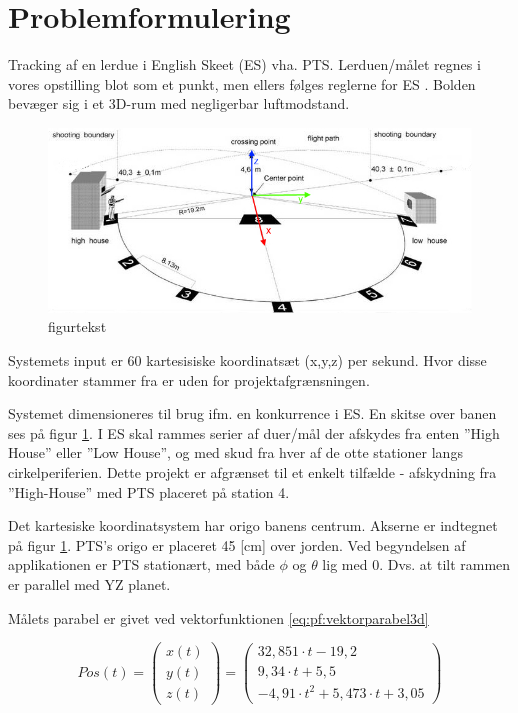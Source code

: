 \section{Problemformulering}
Tracking af en lerdue i English Skeet (ES) vha. PTS. 
Lerduen/målet regnes i vores opstilling blot som et punkt, men ellers følges reglerne for ES \citep{ES_regler}.
Bolden bevæger sig i et 3D-rum med negligerbar luftmodstand. 

\begin{figure}[th!]
\centering
\includegraphics[width=1\textwidth]{./graphics/skeet_diagram_cropped_axes}
\caption[tekst i indholdsfortegnelsen]{figurtekst}
\label{fig:ES}
\end{figure}	
Systemets input er 60 kartesisiske koordinatsæt (x,y,z) per sekund. Hvor disse 
koordinater stammer fra er uden for projektafgrænsningen. 

Systemet dimensioneres til brug ifm. en konkurrence i ES. En skitse over 
banen ses på figur \ref{fig:ES}.
I ES skal rammes serier af duer/mål der afskydes fra 
enten ”High House” eller ”Low House”, og med skud fra hver af de otte stationer langs 
cirkelperiferien. Dette projekt er afgrænset til et enkelt tilfælde - afskydning fra ”High-House” med PTS placeret på station 4. 

Det kartesiske koordinatsystem har origo banens centrum. Akserne er indtegnet på figur \ref{fig:ES}. PTS's origo er placeret 45 [cm] over jorden. Ved begyndelsen af applikationen er PTS stationært, med både $\phi$ og $\theta$ lig med 0. Dvs. at tilt rammen er parallel med YZ planet. 

Målets parabel er givet ved vektorfunktionen \ref{eq:pf:vektorparabel3d}

\begin{equation}
Pos\left( t \right) = 
\left( \begin{matrix} 
	x\left( t \right)  \\ 
	y\left( t \right)  \\ 
	z\left( t \right)  \end{matrix} \right) =	\left( \begin{matrix}
	32,851\cdot t-19,2 \\
	9,34\cdot t+5,5 \\
	-{ 4,91\cdot t }^{ 2 }+5,473\cdot t+3,05 
 \end{matrix} \right) 
\label{eq:pf:vektorparabel3d}
\end{equation}

